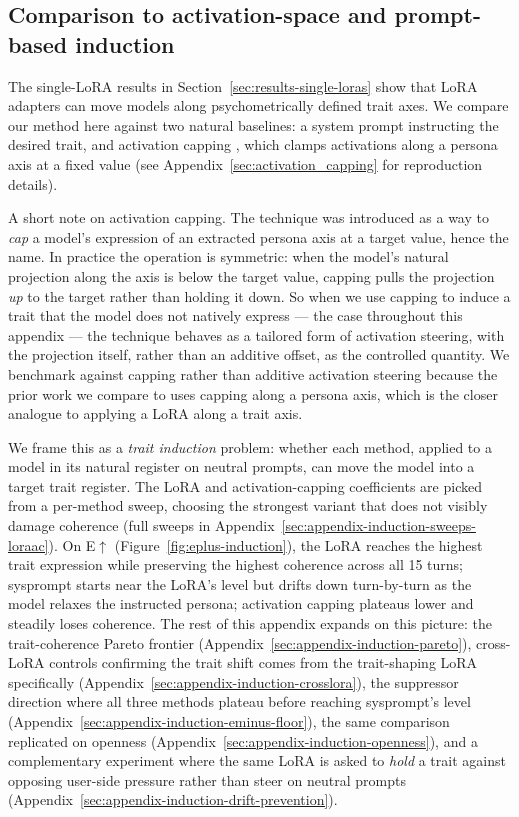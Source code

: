 \subsection{Comparison to activation-space and prompt-based induction}\label{sec:comparison-induction}

The single-LoRA results in Section~\ref{sec:results-single-loras} show that LoRA adapters can move models along psychometrically defined trait axes. We compare our method here against two natural baselines: a system prompt instructing the desired trait, and activation capping \citep{lu2026assistant}, which clamps activations along a persona axis at a fixed value (see Appendix~\ref{sec:activation_capping} for reproduction details).

A short note on activation capping. The technique was introduced as a way to \emph{cap} a model's expression of an extracted persona axis at a target value, hence the name. In practice the operation is symmetric: when the model's natural projection along the axis is below the target value, capping pulls the projection \emph{up} to the target rather than holding it down. So when we use capping to induce a trait that the model does not natively express --- the case throughout this appendix --- the technique behaves as a tailored form of activation steering, with the projection itself, rather than an additive offset, as the controlled quantity. We benchmark against capping rather than additive activation steering because the prior work we compare to \citep{lu2026assistant} uses capping along a persona axis, which is the closer analogue to applying a LoRA along a trait axis.

We frame this as a \emph{trait induction} problem: whether each method, applied to a model in its natural register on neutral prompts, can move the model into a target trait register. The LoRA and activation-capping coefficients are picked from a per-method sweep, choosing the strongest variant that does not visibly damage coherence (full sweeps in Appendix~\ref{sec:appendix-induction-sweeps-loraac}). On E$\uparrow$ (Figure~\ref{fig:eplus-induction}), the LoRA reaches the highest trait expression while preserving the highest coherence across all 15 turns; sysprompt starts near the LoRA's level but drifts down turn-by-turn as the model relaxes the instructed persona; activation capping plateaus lower and steadily loses coherence. The rest of this appendix expands on this picture: the trait-coherence Pareto frontier (Appendix~\ref{sec:appendix-induction-pareto}), cross-LoRA controls confirming the trait shift comes from the trait-shaping LoRA specifically (Appendix~\ref{sec:appendix-induction-crosslora}), the suppressor direction where all three methods plateau before reaching sysprompt's level (Appendix~\ref{sec:appendix-induction-eminus-floor}), the same comparison replicated on openness (Appendix~\ref{sec:appendix-induction-openness}), and a complementary experiment where the same LoRA is asked to \emph{hold} a trait against opposing user-side pressure rather than steer on neutral prompts (Appendix~\ref{sec:appendix-induction-drift-prevention}).

